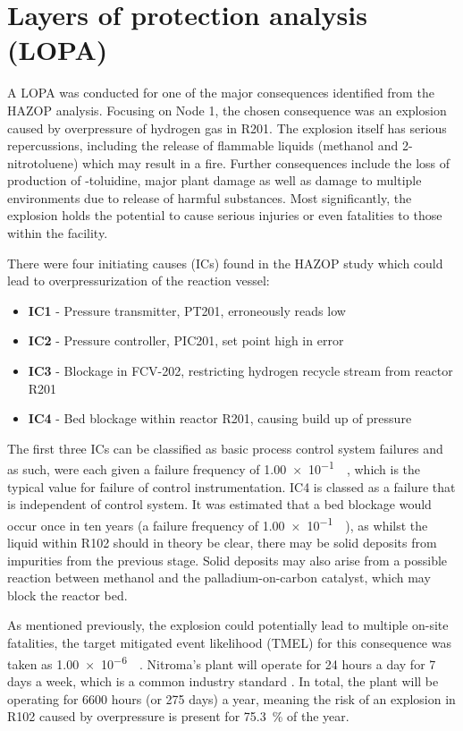 \section{Layers of protection analysis (LOPA)}
\label{sec:LOPA}

A LOPA was conducted for one of the major consequences identified from the HAZOP analysis. Focusing on Node 1, the chosen consequence was an explosion caused by overpressure of hydrogen gas in R201. The explosion itself has serious repercussions, including the release of flammable liquids (methanol and 2-nitrotoluene) which may result in a fire. Further consequences include the loss of production of \ortho-toluidine, major plant damage as well as damage to multiple environments due to release of harmful substances. Most significantly, the explosion holds the potential to cause serious injuries or even fatalities to those within the facility. 

There were four initiating causes (ICs) found in the HAZOP study which could lead to overpressurization of the reaction vessel:

\begin{itemize}
\item \textbf{IC1} - Pressure transmitter, PT201, erroneously reads low 
\item \textbf{IC2} -  Pressure controller, PIC201, set point high in error
\item \textbf{IC3 }- Blockage in FCV-202, restricting hydrogen recycle stream from reactor R201 
\item \textbf{IC4} - Bed blockage within reactor R201, causing build up of pressure 
\end{itemize}

The first three ICs can be classified as basic process control system failures and as such, were each given a failure frequency of \SI{1.00e-1}{\per\year}, which is the typical value for failure of control instrumentation. IC4 is classed as a failure that is independent of control system. It was estimated that a bed blockage would occur once in ten years (a failure frequency of \SI{1.00e-1}{\per\year}), as whilst the liquid within R102 should in theory be clear, there may be solid deposits from impurities from the previous stage. Solid deposits may also arise from a possible reaction between methanol and the palladium-on-carbon catalyst, which may block the reactor bed. 

As mentioned previously, the explosion could potentially lead to multiple on-site fatalities, the target mitigated event likelihood (TMEL) for this consequence was taken as \SI{1.00e-6}{\per\year}. Nitroma's plant will operate for 24 hours a day for 7 days a week, which is a common industry standard \cite{job_guide_chemical_2021}. In total, the plant will be operating for 6600 hours (or 275 days) a year, meaning the risk of an explosion in R102 caused by overpressure is present for \SI{75.3}{\percent} of the year.  
 
